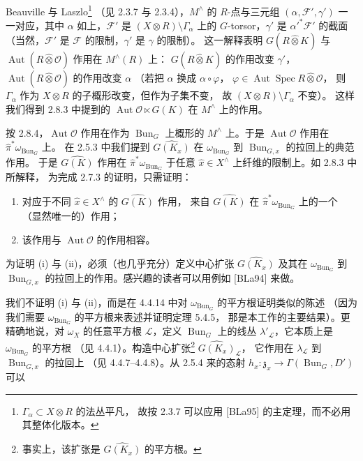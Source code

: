
Beauville 与 Laszlo\footnote{$\Gamma_\alpha\subset X\otimes R$ 的法丛平凡，
故按 2.3.7 可以应用 [BLa95] 的主定理，而不必用其整体化版本。}
（见 2.3.7 与 2.3.4），$M^\wedge$ 的 $R$-点与三元组 $(\alpha,\mathcal{F}',\gamma')$
一一对应，其中 $\alpha$ 如上，$\mathcal{F}'$ 是 $(X\otimes R)\setminus\Gamma_\alpha$
上的 $G$-torsor，$\gamma'$ 是 $\alpha'^*\mathcal{F}'$ 的截面
（当然，$\mathcal{F}'$ 是 $\mathcal{F}$ 的限制，$\gamma'$ 是 $\gamma$ 的限制）。
这一解释表明 $G(R\widehat{\otimes}K)$ 与
$\operatorname{Aut}(R\widehat{\otimes}\mathcal{O})$ 作用在 $M^\wedge(R)$ 上：
$G(R\widehat{\otimes}K)$ 的作用改变 $\gamma'$，
$\operatorname{Aut}(R\widehat{\otimes}\mathcal{O})$ 的作用改变 $\alpha$
（若把 $\alpha$ 换成 $\alpha\circ\varphi$，
$\varphi\in\operatorname{Aut}\operatorname{Spec} R\widehat{\otimes}\mathcal{O}$，
则 $\Gamma_\alpha$ 作为 $X\otimes R$ 的子概形改变，但作为子集不变，
故 $(X\otimes R)\setminus\Gamma_\alpha$ 不变）。
这样我们得到 2.8.3 中提到的 $\operatorname{Aut}\mathcal{O}\ltimes G(K)$
在 $M^\wedge$ 上的作用。

 按 2.8.4，$\operatorname{Aut}\mathcal{O}$ 作用在作为
$\operatorname{Bun}_G$ 上概形的 $M^\wedge$ 上。于是 $\operatorname{Aut}\mathcal{O}$
作用在 $\hat{\pi}^*\omega_{\operatorname{Bun}_G}$ 上。
在 2.5.3 中我们提到 $\widehat{G(K_x)}$ 在 $\omega_{\operatorname{Bun}_G}$
到 $\operatorname{Bun}_{G,x}$ 的拉回上的典范作用。
于是 $\widehat{G(K)}$ 作用在 $\hat{\pi}^*\omega_{\operatorname{Bun}_G}$
于任意 $\hat{x}\in X^\wedge$ 上纤维的限制上。如 2.8.3 中所解释，
为完成 2.7.3 的证明，只需证明：
\begin{enumerate}[label=(\roman*),leftmargin=2.6em]
\item 对应于不同 $\hat{x}\in X^\wedge$ 的 $\widehat{G(K)}$ 作用，
  来自 $\widehat{G(K)}$ 在 $\hat{\pi}^*\omega_{\operatorname{Bun}_G}$ 上的一个
  （显然唯一的）作用；
\item 该作用与 $\operatorname{Aut}\mathcal{O}$ 的作用相容。
\end{enumerate}
为证明 (i) 与 (ii)，必须（也几乎充分）定义中心扩张 $\widehat{G(K_x)}$
及其在 $\omega_{\operatorname{Bun}_G}$ 到 $\operatorname{Bun}_{G,x}$
的拉回上的作用。感兴趣的读者可以用例如 [BLa94] 来做。

我们不证明 (i) 与 (ii)，而是在 4.4.14 中对
$\omega_{\operatorname{Bun}_G}$ 的平方根证明类似的陈述
（因为我们需要 $\omega_{\operatorname{Bun}_G}$ 的平方根来表述并证明定理 5.4.5，
那是本工作的主要结果）。更精确地说，对 $\omega_X$ 的任意平方根
$\mathcal{L}$，定义 $\operatorname{Bun}_G$ 上的线丛
$\lambda'_{\mathcal{L}}$，它本质上是 $\omega_{\operatorname{Bun}_G}$ 的平方根
（见 4.4.1）。构造中心扩张\footnote{事实上，该扩张是
$\widehat{G(K_x)}$ 的平方根。} $\widehat{G(K_x)}_{\mathcal{L}}$，
它作用在 $\lambda_{\mathcal{L}}$ 到 $\operatorname{Bun}_{G,x}$ 的拉回上
（见 4.4.7--4.4.8）。从 2.5.4 来的态射
$h_x:\mathfrak{z}_x\to\Gamma(\operatorname{Bun}_G,D')$ 可以

